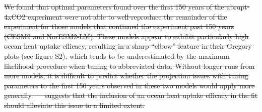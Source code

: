 \documentclass[gmd, manuscript]{copernicus}
\providecommand{\DIFdel}[1]{{\protect\color{red}\sout{#1}}}                      %
\providecommand{\DIFdelbegin}{} %
\providecommand{\DIFdelend}{} %
\begin{document}
\DIFdelbegin \DIFdel{We found that optimal parameters found over the first 150 years of the abrupt-4xCO2 experiment were not able to well-reproduce the remainder of the experiment for those models that continued the experiment past 150 years (CESM2 and NorESM2-LM). These models appear to exhibit particularly high ocean heat uptake efficacy, resulting in a sharp ``elbow'' feature in their Gregory plots (see figure S2), which tends to be underestimated by the maximum likelihood procedure when tuning to abbreviated data. Without longer runs from more models, it is difficult to predict whether the projection issues with tuning parameters to the first 150 years observed in these two models would apply more generally. \mbox{%
\cite{Rugenstein2020} }\hspace{0pt}%
suggests that the inclusion of an ocean heat uptake efficacy in the fit should alleviate this issue to a limited extent.
}\DIFdelend %
\end{document}
